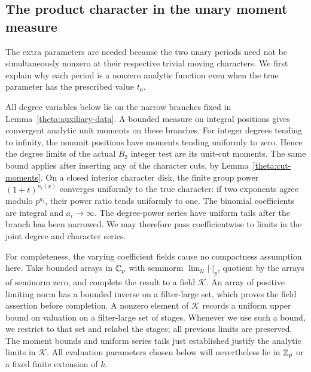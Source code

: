 \subsection{The product character in the unary moment measure}

The extra parameters are needed because the two unary periods need
not be simultaneously nonzero at their respective trivial moving
characters.  We first explain why each period is a nonzero analytic
function even when the true parameter has the prescribed value $t_0$.

All degree variables below lie on the narrow branches fixed in
Lemma~\ref{theta:auxiliary-data}.  A bounded measure on integral
positions gives convergent analytic unit moments on these branches.
For integer degrees tending to infinity, the nonunit positions have
moments tending uniformly to zero.  Hence the degree limits of the
actual $B_2$ integer test are its unit-cut moments.  The same bound
applies after inserting any of the character cuts, by
Lemma~\ref{theta:cut-moments}.  On a closed interior character disk,
the finite group power $(1+t)^{n_i(x)}$ converges uniformly to the
true character: if two exponents agree modulo $p^{a_i}$, their power
ratio tends uniformly to one.  The binomial coefficients are
integral and $a_i\to\infty$.  The degree-power series have uniform
tails after the branch has been narrowed.  We may therefore pass
coefficientwise to limits in the joint degree and character series.

For completeness, the varying coefficient fields cause no
compactness assumption here.  Take bounded arrays in $\mathbb C_p$ with
seminorm $\lim_{\mathcal U}|\cdot|_p$, quotient by the arrays of
seminorm zero, and complete the result to a field $\mathcal K$.
An array of positive limiting norm has a bounded inverse on a
filter-large set, which proves the field assertion before
completion.  A nonzero element of $\mathcal K$ records a uniform
upper bound on valuation on a filter-large set of stages.  Whenever
we use such a bound, we restrict to that set and relabel the stages;
all previous limits are preserved.  The moment bounds and uniform series
tails just established justify the analytic limits in $\mathcal K$.
All evaluation parameters chosen below will nevertheless lie in
$\mathbb Z_p$ or a fixed finite extension of $k$.

